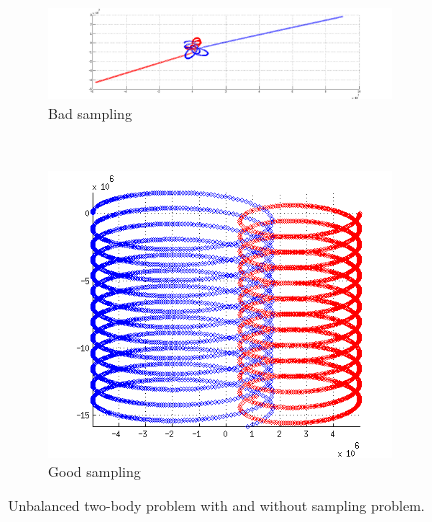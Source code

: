 \documentclass{article}
\begin{document}
\begin{figure}[H]
        \centering
        \begin{subfigure}[b]{0.7\textwidth}
                \centering
                \includegraphics[width=\textwidth]{img/g_k}
                \caption{Bad sampling}
                \label{fig:gk}
        \end{subfigure}%
        ~ %
        \begin{subfigure}[b]{0.25\textwidth}
                \centering
                \includegraphics[width=\textwidth]{img/g_k_balanced}
                \caption{Good sampling}
                \label{fig:gkfixed}
        \end{subfigure}
        \caption{Unbalanced two-body problem with and without sampling problem.}\label{fig:sample}
\end{figure}

\end{document}
